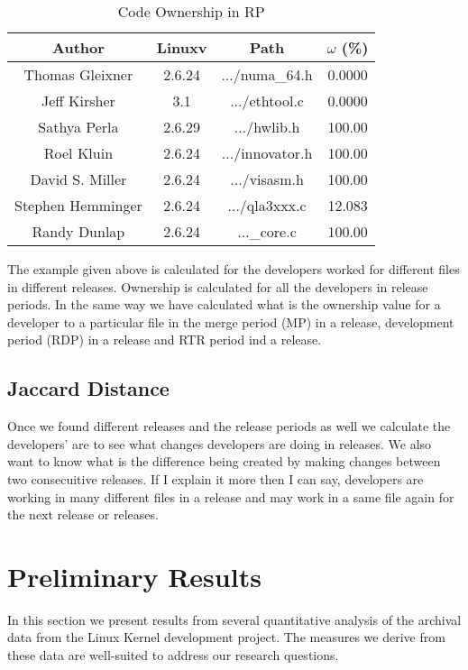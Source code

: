 \documentclass{acm_proc_article-sp}
\begin{document}
\begin{table}[ht]
\caption{Code Ownership in RP}  %
\centering 						%
\begin{tabular}{c c c c}				%
\hline\hline						%
Author 				& Linuxv		& Path				& $\omega$ (\%) \\ [0.5ex]
\hline 							%
Thomas Gleixner		& 2.6.24		& .../numa\_64.h	& 0.0000\\
Jeff Kirsher			& 3.1		& .../ethtool.c		& 0.0000\\
Sathya Perla			& 2.6.29		& .../hwlib.h		& 100.00\\
Roel Kluin			& 2.6.24		& .../innovator.h 	& 100.00\\
David S. Miller		& 2.6.24		& .../visasm.h 		& 100.00\\
Stephen Hemminger	& 2.6.24		& .../qla3xxx.c	 	& 12.083\\
Randy Dunlap			& 2.6.24		& ...\_core.c 		& 100.00\\
[1ex]							%
\hline 							%
\end{tabular}
\label{table:nonlin} 				%
\end{table}
The example given above is calculated for the developers worked for different files in different releases. Ownership is calculated for all the developers in release periods. In the same way we have calculated what is the ownership value for a developer to a particular file in the merge period (MP) in a release, development period (RDP) in a release and RTR period ind a release.

\subsection{Jaccard Distance}
Once we found different releases and the release periods as well we calculate the developers' are to see what changes developers are doing in releases. We also want to know what is the difference being created by making changes between two consecuitive releases. If I explain it more then I can say, developers are working in many different files in a release and may work in a same file again for the next release or releases. 

\section{Preliminary Results}
In this section we present results from several quantitative analysis of the archival data from the Linux Kernel development project. The measures we derive from these data are well-suited to address our research questions.
\end{document}
